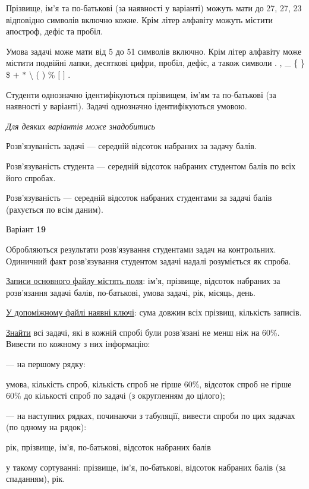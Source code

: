 \documentclass[11pt, ukrainian]{article}
\begin{document}
Прізвище, ім’я та по-батькові (за наявності у варіанті) можуть мати до 27, 27, 23 відповідно символів включно кожне. 
Крім літер алфавіту можуть містити апостроф, дефіс та пробіл.

Умова задачі може мати від 5 до 51 символів включно.
Крім літер алфавіту може містити подвійні лапки, десяткові цифри, пробіл, дефіс,
а також символи . , \_ \{ \} \$ $+$ $*$ {\textbackslash} ( ) \% $[$ $]$ .

Студенти однозначно ідентифікуються прізвищем, ім’ям та по-батькові (за наявності у варіанті).
Задачі однозначно ідентифікуються умовою.

\bigskip\textit{Для деяких варіантів може знадобитись}

Розв'язуваність задачі --- середній відсоток набраних за задачу балів.

Розв'язуваність студента --- середній відсоток набраних студентом балів по всіх його спробах.

Розв'язуваність --- середній відсоток набраних студентами за задачі балів (рахується по всім даним).


\par
\newpage
{\center Варіант  \No \textbf { 19 }\par}
\bigskip
Обробляються результати розв’язування студентами задач на контрольних.
Одиничний факт роз\-в’я\-зу\-вання студентом задачі надалі розуміється як спроба.

\underline{Записи основного файлу містять поля}: ім’я, прізвище, відсоток набраних за розв’язання задачі балів, по-батькові, умова задачі, рік, місяць, день.

\underline{У допоміжному файлі наявні ключі}: сума довжин всіх прізвищ, кількість записів.

\underline{Знайти} всі задачі, які в кожній спробі були розв’язані не менш ніж на 60\%. Вивести по кожному з них інформацію:\par
{\noindent}--- на першому рядку:\par
умова, кількість спроб, кількість спроб не гірше 60\%, відсоток спроб не гірше 60\% до кількості спроб по задачі (з округленням до цілого);

{\noindent}--- на наступних рядках, починаючи з табуляції, вивести спроби по цих задачах (по одному на рядок):\par
рік, прізвище, ім’я, по-батькові, відсоток набраних балів

{\noindent}у такому сортуванні: прізвище, ім’я, по-батькові, відсоток набраних балів (за спаданням), рік.
\end{document}
